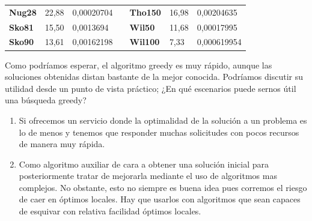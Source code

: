 \documentclass[a4paper, 12pt]{article}
\begin{document}
\begin{table}[H]
\begin{tabular}{|l|l|l|l|l|l|l|}
\textbf{Nug28}   & 22,88                              & 0,00020704                           &  & \textbf{Tho150}  & 16,98                              & 0,00204635                           \\ \cline{1-3} \cline{5-7} 
\textbf{Sko81}   & 15,50                              & 0,0013694                            &  & \textbf{Wil50}   & 11,68                              & 0,00017995                           \\ \cline{1-3} \cline{5-7} 
\textbf{Sko90}   & 13,61                              & 0,00162198                           &  & \textbf{Wil100}  & 7,33                               & 0,000619954                          \\ \cline{1-3} \cline{5-7} 
\end{tabular}
\end{table}

      Como podríamos esperar, el algoritmo greedy es muy rápido, aunque las soluciones obtenidas distan bastante de la mejor conocida. Podríamos discutir su utilidad desde un punto de vista práctico; ¿En qué escenarios puede sernos útil una búsqueda greedy?
      
      \begin{enumerate}
         \item Si ofrecemos un servicio donde la optimalidad de la solución a un problema es lo de menos y tenemos que responder muchas solicitudes con pocos recursos de manera muy rápida.
         
         \item Como algoritmo auxiliar de cara a obtener una solución inicial para posteriormente tratar de mejorarla mediante el uso de algoritmos mas complejos. No obstante, esto no siempre es buena idea pues corremos el riesgo de caer en óptimos locales. Hay que usarlos con algoritmos que sean capaces de esquivar con relativa facilidad óptimos locales.         
      \end{enumerate}

      
      \newpage
\end{document}

